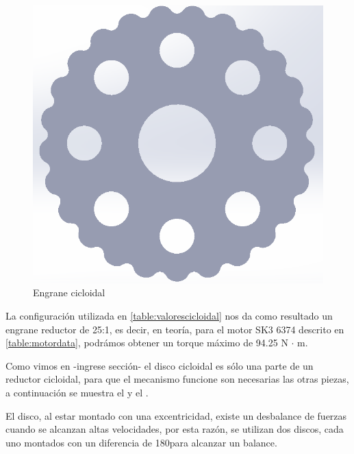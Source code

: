 \begin{figure}
    \centering
    \includegraphics[scale=0.6]{./img/chapter3/cicloidaldisk.png}
    \caption{Engrane cicloidal}
    \label{fig:cicloidaldisk}
\end{figure}

La configuración utilizada en \ref{table:valorescicloidal} nos da como resultado un engrane reductor de 25:1, es decir, en teoría, para el motor SK3 6374 descrito en \ref{table:motordata}, podrámos obtener un torque máximo de 94.25 N $\cdot$ m. 

Como vimos en -ingrese sección- el disco cicloidal es sólo una parte de un reductor cicloidal, para que el mecanismo funcione son necesarias las otras piezas, a continuación se muestra el y el .

El disco, al estar montado con una excentricidad, existe un desbalance de fuerzas cuando se alcanzan altas velocidades, por esta razón, se utilizan dos discos, cada uno montados con un diferencia de 180\degree para alcanzar un balance.





  